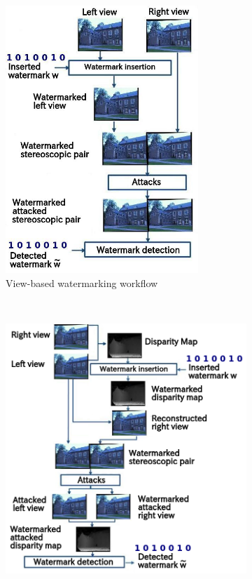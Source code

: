 \begin{figure}[h!]
\centering
\begin{subfigure}[]{0.4\textwidth}
\centering
\includegraphics[width=0.8\textwidth]{./img/views_domain.jpeg}
\caption{\small{View-based watermarking workflow}}
\label{fig:view}
\end{subfigure}%
~ %
\begin{subfigure}[]{0.4\textwidth}
\centering
\includegraphics[width=1.05\textwidth]{./img/disparity_domain.png}

\end{subfigure}
\end{figure}
